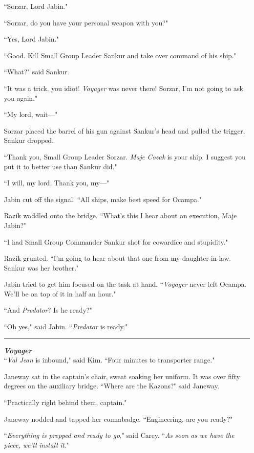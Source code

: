 \documentclass[twoside,letterpaper,12pt]{memoir}
\begin{document}
``Sorzar, Lord Jabin."

``Sorzar, do you have your personal weapon with you?"

``Yes, Lord Jabin."

``Good. Kill Small Group Leader Sankur and take over command of his ship."

``What?" said Sankur.

``It was a trick, you idiot! \textit{Voyager} was never there! Sorzar, I'm not going to ask you again."

``My lord, wait---"

Sorzar placed the barrel of his gun against Sankur's head and pulled the trigger. Sankur dropped.

``Thank you, Small Group Leader Sorzar. \textit{Maje Cozak} is your ship. I suggest you put it to better use than Sankur did."

``I will, my lord. Thank you, my---"

Jabin cut off the signal. ``All ships, make best speed for Ocampa."

Razik waddled onto the bridge. ``What's this I hear about an execution, Maje Jabin?"

``I had Small Group Commander Sankur shot for cowardice and stupidity."

Razik grunted. ``I’m going to hear about that one from my daughter-in-law. Sankur was her brother."

Jabin tried to get him focused on the task at hand. ``\textit{Voyager} never left Ocampa. We'll be on top of it in half an hour."

``And \textit{Predator}? Is he ready?"

``Oh yes," said Jabin. ``\textit{Predator} is ready."

\fancybreak{\rule{3cm}{0.4 pt}}
\noindent\textit{\textbf{Voyager}}\\

``\textit{Val Jean} is inbound," said Kim. ``Four minutes to transporter range."

Janeway sat in the captain's chair, sweat soaking her uniform. It was over fifty degrees on the auxiliary bridge. ``Where are the Kazons?" said Janeway.

``Practically right behind them, captain."

Janeway nodded and tapped her commbadge. ``Engineering, are you ready?"

``\textit{Everything is prepped and ready to go}," said Carey. ``\textit{As soon as we have the piece, we'll install it}."
\end{document}
